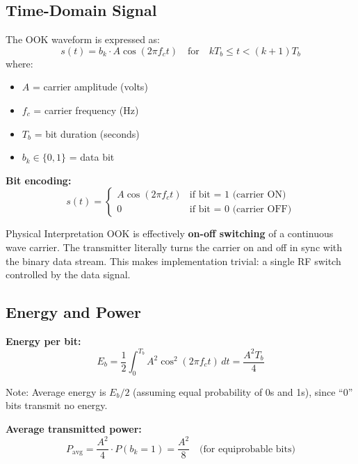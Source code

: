 \subsection{Time-Domain Signal}

The OOK waveform is expressed as:
\begin{equation}
s(t) = b_k \cdot A \cos(2\pi f_c t) \quad \text{for} \quad kT_b \leq t < (k+1)T_b
\end{equation}
where:
\begin{itemize}
\item $A$ = carrier amplitude (volts)
\item $f_c$ = carrier frequency (Hz)
\item $T_b$ = bit duration (seconds)
\item $b_k \in \{0, 1\}$ = data bit
\end{itemize}

\textbf{Bit encoding:}
\begin{equation}
s(t) = \begin{cases}
A \cos(2\pi f_c t) & \text{if bit = 1 (carrier ON)} \\
0 & \text{if bit = 0 (carrier OFF)}
\end{cases}
\end{equation}

\begin{calloutbox}{Physical Interpretation}
OOK is effectively \textbf{on-off switching} of a continuous wave carrier. The transmitter literally turns the carrier on and off in sync with the binary data stream. This makes implementation trivial: a single RF switch controlled by the data signal.
\end{calloutbox}

\subsection{Energy and Power}

\textbf{Energy per bit:}
\begin{equation}
E_b = \frac{1}{2} \int_0^{T_b} A^2 \cos^2(2\pi f_c t)\,dt = \frac{A^2 T_b}{4}
\end{equation}

Note: Average energy is $E_b/2$ (assuming equal probability of 0s and 1s), since ``0'' bits transmit no energy.

\textbf{Average transmitted power:}
\begin{equation}
P_{\text{avg}} = \frac{A^2}{4} \cdot P(b_k = 1) = \frac{A^2}{8} \quad \text{(for equiprobable bits)}
\end{equation}


